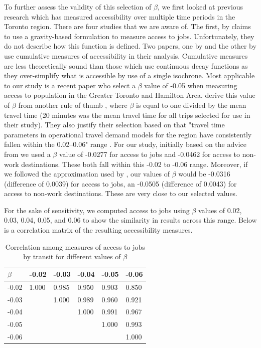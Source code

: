 To further assess the validity of this selection of $\beta$, we first looked at previous research which has measured accessibility over multiple time periods in the Toronto region. There are four studies that we are aware of. The first, by  claims to use a gravity-based formulation to measure access to jobs. Unfortunately, they do not describe how this function is defined. Two papers, one by  and the other by  use cumulative measures of accessibility in their analysis. Cumulative measures are less theoretically sound than those which use continuous decay functions as they over-simplify what is accessible by use of a single isochrone. Most applicable to our study is a recent paper  who select a $\beta$ value of -0.05 when measuring access to population in the Greater Toronto and Hamilton Area.  derive this value of $\beta$ from another rule of thumb \cite{batty_proximate_1984}, where $\beta$ is equal to one divided by the mean travel time (20 minutes was the mean travel time for all trips selected for use in their study). They also justify their selection based on that "travel time parameters in operational travel demand models for the region have consistently fallen within the 0.02–0.06" range \cite{kasraian_multi-decade_2020}. For our study, initially based on the advice from  we used a $\beta$ value of -0.0277 for access to jobs and -0.0462 for access to non-work destinations. These both fall within this -0.02 to -0.06 range. Moreover, if we followed the 
 approximation used by , our values of $\beta$ would be -0.0316 (difference of 0.0039) for access to jobs, an -0.0505 (difference of 0.0043) for access to non-work destinations. These are very close to our selected values.

For the sake of sensitivity, we computed access to jobs using $\beta$ values of 0.02, 0.03, 0.04, 0.05, and 0.06 to show the similarity in results across this range. Below is a correlation matrix of the resulting accessibility measures.

\begin{table}[h]
	\vspace{2mm}
	\small
	\centering
	\caption{Correlation among measures of access to jobs by transit for different values of $\beta$}
	\label{table:beta_cor}
	\begin{tabular}{llllll}
		\hline 
		$\beta$  & -0.02 & -0.03 & -0.04 & -0.05 & -0.06 \\
		\hline
		-0.02 & 1.000 & 0.985 & 0.950 & 0.903 & 0.850 \\
		-0.03 &       & 1.000 & 0.989 & 0.960 & 0.921 \\
		-0.04 &       &       & 1.000 & 0.991 & 0.967 \\
		-0.05 &       &       &       & 1.000 & 0.993 \\
		-0.06 &       &       &       &       & 1.000   \\ \hline 
	\end{tabular}
\end{table}

